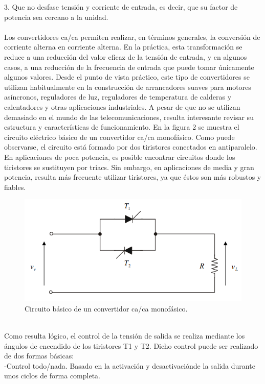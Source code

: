 \documentclass[10pt,a4paper]{article}
\begin{document}
3. Que no desfase tensión y corriente de entrada, es decir, que su factor de potencia
sea cercano a la unidad.\\\\
Los convertidores ca/ca permiten realizar, en términos generales, la conversión de corriente alterna en corriente  alterna.  En  la  práctica,  esta  transformación  se  reduce  a  una  reducción  del  valor  eficaz  de  la  tensión de entrada, y en algunos casos, a una reducción de la frecuencia de entrada que puede tomar únicamente  algunos  valores.  Desde  el  punto  de  vista  práctico,  este  tipo  de  convertidores  se  utilizan habitualmente en la construcción de arrancadores suaves para motores asíncronos, reguladores de luz, reguladores de temperatura de calderas y calentadores y otras aplicaciones industriales. A pesar de que no  se  utilizan  demasiado  en  el  mundo  de  las  telecomunicaciones,  resulta  interesante  revisar  su  estructura y características de funcionamiento. En  la  figura 2 se  muestra  el  circuito  eléctrico  básico  de  un  convertidor  ca/ca  monofásico.  Como  puede   observarse,   el   circuito   está   formado   por   dos   tiristores   conectados   en   antiparalelo.   En   aplicaciones  de  poca  potencia,  es  posible  encontrar  circuitos  donde  los  tiristores  se  sustituyen  por  triacs. Sin embargo, en aplicaciones de media y gran potencia, resulta más frecuente utilizar tiristores, ya que éstos son más robustos y fiables. \\
\begin{figure}[hbtp]
\centering
\includegraphics[scale=0.4]{Circuito.png}
\caption{Circuito básico de un convertidor ca/ca monofásico. }
\end{figure}\\
Como resulta lógico, el control de la tensión de salida se realiza mediante los ángulos de encendido de los tiristores T1 y T2. Dicho control puede ser realizado de dos formas básicas:\\-Control todo/nada. Basado en la activación y desactivaciónde la salida durante unos ciclos de forma completa. \\
\end{document}
